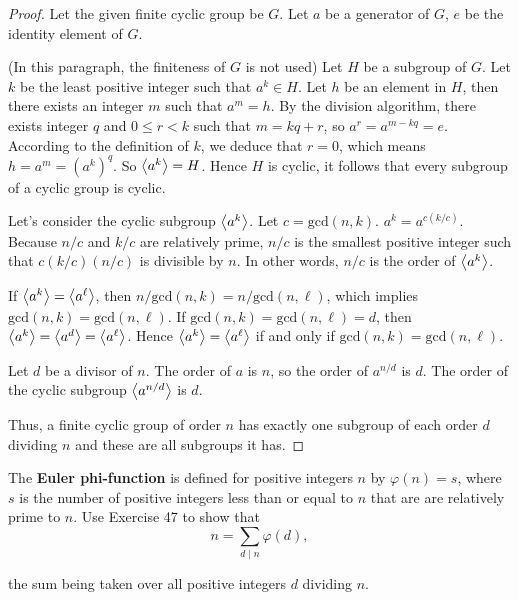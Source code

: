 \begin{proof}
    Let the given finite cyclic group be $G$. Let $a$ be a generator of $G$, $e$ be the identity element of $G$.

    (In this paragraph, the finiteness of $G$ is not used) Let $H$ be a subgroup of $G$. Let $k$ be the least positive integer such that $a^{k}\in H$. Let $h$ be an element in $H$, then there exists an integer $m$ such that $a^{m} = h$. By the division algorithm, there exists integer $q$ and $0\leq r < k$ such that $m = kq + r$, so $a^{r} = a^{m-kq} = e$. According to the definition of $k$, we deduce that $r = 0$, which means $h = a^{m} = {(a^{k})}^{q}$. So $\left\langle{a^{k}}\right\rangle = H$. Hence $H$ is cyclic, it follows that every subgroup of a cyclic group is cyclic.

    \hrulefill{}

    Let's consider the cyclic subgroup $\left\langle{a^{k}}\right\rangle$. Let $c = \text{gcd}(n,k)$. $a^{k} = a^{c(k/c)}$. Because $n/c$ and $k/c$ are relatively prime, $n/c$ is the smallest positive integer such that $c(k/c)(n/c)$ is divisible by $n$. In other words, $n/c$ is the order of $\left\langle{a^{k}}\right\rangle$.

    If $\left\langle{a^{k}}\right\rangle = \left\langle{a^{\ell}}\right\rangle$, then $n/\text{gcd}(n,k) = n/\text{gcd}(n,\ell)$, which implies $\text{gcd}(n,k) = \text{gcd}(n,\ell)$. If $\text{gcd}(n,k) = \text{gcd}(n,\ell) = d$, then $\left\langle{a^{k}}\right\rangle = \left\langle{a^{d}}\right\rangle = \left\langle{a^{\ell}}\right\rangle$. Hence $\left\langle{a^{k}}\right\rangle = \left\langle{a^{\ell}}\right\rangle$ if and only if $\text{gcd}(n,k) = \text{gcd}(n,\ell)$.

    Let $d$ be a divisor of $n$. The order of $a$ is $n$, so the order of $a^{n/d}$ is $d$. The order of the cyclic subgroup $\left\langle{a^{n/d}}\right\rangle$ is $d$.

    Thus, a finite cyclic group of order $n$ has exactly one subgroup of each order $d$ dividing $n$ and these are all subgroups it has.
\end{proof}

\newpage
\begin{exercise}
    The \textbf{Euler phi-function} is defined for positive integers $n$ by $\varphi(n) = s$, where $s$ is the number of positive integers less than or equal to $n$ that are are relatively prime to $n$. Use Exercise 47 to show that
    \[
        n = \sum_{d \mid n}\varphi(d),
    \]

    the sum being taken over all positive integers $d$ dividing $n$.
\end{exercise}

